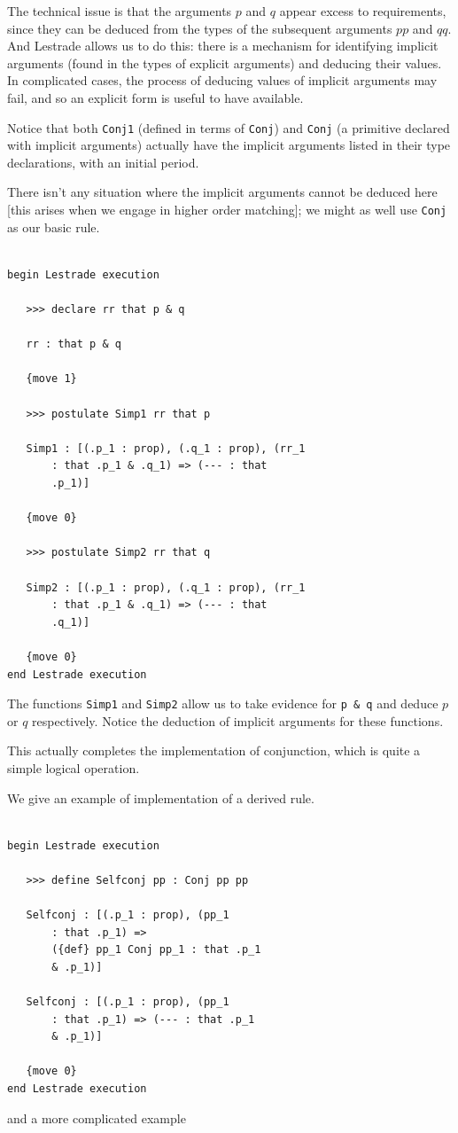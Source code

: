 \documentclass[12pt]{article}
\begin{document}
The technical issue is that the arguments $p$ and $q$ appear excess to requirements, since they can be deduced from the types of the subsequent arguments $pp$ and $qq$.  And Lestrade allows us to do this:  there is a mechanism for identifying implicit arguments (found in the types of explicit arguments) and deducing their values.  In complicated cases, the process of deducing values of implicit arguments may fail, and so an explicit form is useful to have available.

Notice that both {\tt Conj1} (defined in terms of {\tt Conj}) and {\tt Conj} (a primitive declared with implicit arguments)
actually have the implicit arguments listed in their type declarations, with an initial period.

There isn't any situation where the implicit arguments cannot be deduced here [this arises when we engage in higher order matching];  we might as well use {\tt Conj} as our basic rule.
\begin{verbatim}

begin Lestrade execution

   >>> declare rr that p & q

   rr : that p & q

   {move 1}

   >>> postulate Simp1 rr that p

   Simp1 : [(.p_1 : prop), (.q_1 : prop), (rr_1 
       : that .p_1 & .q_1) => (--- : that 
       .p_1)]

   {move 0}

   >>> postulate Simp2 rr that q

   Simp2 : [(.p_1 : prop), (.q_1 : prop), (rr_1 
       : that .p_1 & .q_1) => (--- : that 
       .q_1)]

   {move 0}
end Lestrade execution

\end{verbatim}

The functions {\tt Simp1} and {\tt Simp2} allow us to take evidence for {\tt p \& q} and deduce $p$ or $q$ respectively.  Notice the deduction of implicit arguments for these functions.

This actually completes the implementation of conjunction, which is quite a simple logical operation.

We give an example of implementation of a derived rule.

\begin{verbatim}

begin Lestrade execution

   >>> define Selfconj pp : Conj pp pp

   Selfconj : [(.p_1 : prop), (pp_1 
       : that .p_1) => 
       ({def} pp_1 Conj pp_1 : that .p_1 
       & .p_1)]

   Selfconj : [(.p_1 : prop), (pp_1 
       : that .p_1) => (--- : that .p_1 
       & .p_1)]

   {move 0}
end Lestrade execution
\end{verbatim}
and a more complicated example
\end{document}
